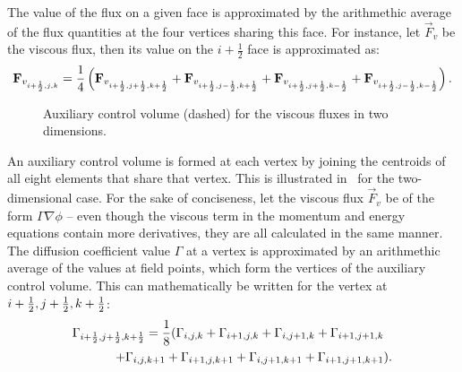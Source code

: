 The value of the flux on a given face is approximated by the arithmethic average of the flux quantities at the four vertices sharing this face. For instance, let $\vec{F}_v$ be the viscous flux, then its value on the $i+\frac{1}{2}$ face is approximated as:
\begin{equation*}
    \vec{F}_{v_{i+\half,j,k}} = \frac{1}{4} \left(
        \vec{F}_{v_{i+\half,j+\half,k+\half}} +
        \vec{F}_{v_{i+\half,j-\half,k+\half}} +
        \vec{F}_{v_{i+\half,j+\half,k-\half}} +
        \vec{F}_{v_{i+\half,j-\half,k-\half}}
    \right).
\end{equation*}
\begin{figure}
    \centering
    \begin{tikzpicture}[scale=3.0]
    \end{tikzpicture}
    \caption{Auxiliary control volume (dashed) for the viscous fluxes in two dimensions.}
    \label{fig:synaux}
\end{figure}

An auxiliary control volume is formed at each vertex by joining the centroids of all eight elements that share that vertex. This is illustrated in~ for the two-dimensional case. For the sake of conciseness, let the viscous flux $\vec{F}_v$ be of the form $\Gamma \nabla \phi$ -- even though the viscous term in the momentum and energy equations contain more derivatives, they are all calculated in the same manner. The diffusion coefficient value $\Gamma$ at a vertex is approximated by an arithmethic average of the values at field points, which form the vertices of the auxiliary control volume. This can mathematically be written for the vertex at $i+\half,j+\half,k+\half$:
\begin{align*}
    \Gamma_{i+\half,j+\half,k+\half} = \frac{1}{8} (
        \Gamma_{i,j,k} + \Gamma_{i+1,j,k} + \Gamma_{i,j+1,k} + \Gamma_{i+1,j+1,k}&
        \\
        + \Gamma_{i,j,k+1} + \Gamma_{i+1,j,k+1} + \Gamma_{i,j+1,k+1} + \Gamma_{i+1,j+1,k+1}&).
\end{align*}

